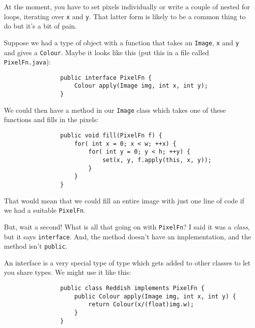 \documentclass{article}
\begin{document}
            At the moment, you have to set pixels individually or write a couple of nested for loops, iterating over \texttt{x} and
            \texttt{y}.  That latter form is likely to be a common thing to do but it's a bit of pain.  
            
            Suppose we had a type of object with a function that takes an \texttt{Image}, \texttt{x} and \texttt{y} and gives a
            \texttt{Colour}. Maybe it looks like this (put this in a file called \texttt{PixelFn.java}):
        
            \begin{verbatim}
                public interface PixelFn {
                    Colour apply(Image img, int x, int y);
                }
            \end{verbatim}
            
            We could then have a method in our \texttt{Image} class which takes one of these functions and fills in the pixels:

            \begin{verbatim}
                public void fill(PixelFn f) {
                    for( int x = 0; x < w; ++x) {
                        for( int y = 0; y < h; ++y) {
                            set(x, y, f.apply(this, x, y));
                        }
                    }
                }
            \end{verbatim}
            
            That would mean that we could fill an entire image with just one line of code if we had a suitable \texttt{PixelFn}.
            
            But, wait a second! What is all that going on with \texttt{PixelFn}? I said it was a \emph{class}, but it says
            \texttt{interface}. And, the method doesn't have an implementation, and the method isn't \texttt{public}.
            
            An interface is a very special type of type which gets added to other classes to let you share types. We might use it like this:

            \begin{verbatim}
                public class Reddish implements PixelFn {
                    public Colour apply(Image img, int x, int y) {
                        return Colour(x/(float)img.w);
                    }
                }
            \end{verbatim}
            
\end{document}
